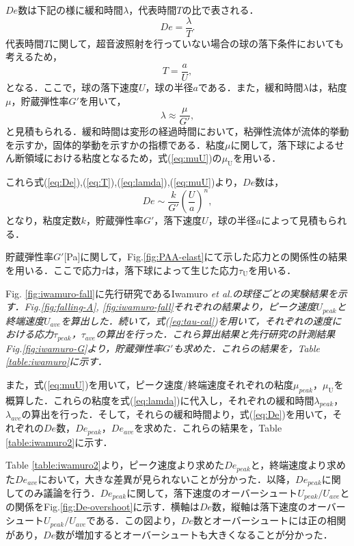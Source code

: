 $De$数は下記の様に緩和時間$\lambda$，代表時間$T$の比で表される．
\begin{equation}
    De = \frac{\lambda}{T} .
    \label{eq:De}
\end{equation}
代表時間$T$に関して，超音波照射を行っていない場合の球の落下条件においても考えるため，
\begin{equation}
    T = \frac{a}{U} ,
    \label{eq:T}
\end{equation}
となる．ここで，球の落下速度$U$，球の半径$a$である．また，緩和時間$\lambda$は，粘度$\mu$，貯蔵弾性率$G'$を用いて，
\begin{equation}
    \lambda \approx \frac{\mu}{G'} ,
    \label{eq:lamda}
\end{equation}
と見積もられる．緩和時間は変形の経過時間において，粘弾性流体が流体的挙動を示すか，固体的挙動を示すかの指標である\cite{ref:sakanishi}．粘度$\mu$に関して，落下球によるせん断領域における粘度となるため，式(\ref{eq:muU})の$\mu_\text{U}$を用いる．

これら式(\ref{eq:De}),(\ref{eq:T}),(\ref{eq:lamda}),(\ref{eq:muU})より，$De$数は，
\begin{equation}
    De \sim \frac{k}{G'} {\left(\frac{U}{a}\right)}^n ,
    \label{eq:De2}
\end{equation}
となり，粘度定数$k$，貯蔵弾性率$G'$，落下速度$U$，球の半径$a$によって見積もられる．

貯蔵弾性率$G'$[Pa]に関して，Fig.\ref{fig:PAA-elast}にて示した応力との関係性の結果を用いる．ここで応力$\tau$は，落下球によって生じた応力$\tau_\text{U}$を用いる．

Fig. \ref{fig:iwamuro-fall}に先行研究であるIwamuro \it{et al}.\cite{ref:8}の球径ごとの実験結果を示す．Fig.\ref{fig:falling-A}, \ref{fig:iwamuro-fall}それぞれの結果より，ピーク速度$U_{peak}$と終端速度$U_{ave}$を算出した．続いて，式(\ref{eq:tau-cal})を用いて，それぞれの速度における応力$\tau_{peak}$，$\tau_{ave}$の算出を行った．これら算出結果と先行研究の計測結果Fig.\ref{fig:iwamuro-G}より，貯蔵弾性率$G'$も求めた．これらの結果を，Table \ref{table:iwamuro}に示す．

また，式(\ref{eq:muU})を用いて，ピーク速度/終端速度それぞれの粘度$\mu_{peak}$，$\mu_\text{U}$を概算した．これらの粘度を式(\ref{eq:lamda})に代入し，それぞれの緩和時間$\lambda_{peak}$，$\lambda_{ave}$の算出を行った．そして，それらの緩和時間より，式(\ref{eq:De})を用いて，それぞれの$De$数，$De_{peak}$，$De_{ave}$を求めた．これらの結果を，Table \ref{table:iwamuro2}に示す．

Table \ref{table:iwamuro2}より，ピーク速度より求めた$De_{peak}$と，終端速度より求めた$De_{ave}$において，大きな差異が見られないことが分かった．以降，$De_{peak}$に関してのみ議論を行う．$De_{peak}$に関して，落下速度のオーバーシュート$U_{peak}/U_{ave}$との関係をFig.\ref{fig:De-overshoot}に示す．横軸は$De$数，縦軸は落下速度のオーバーシュート$U_{peak}/U_{ave}$である．この図より，$De$数とオーバーシュートには正の相関があり，$De$数が増加するとオーバーシュートも大きくなることが分かった．


